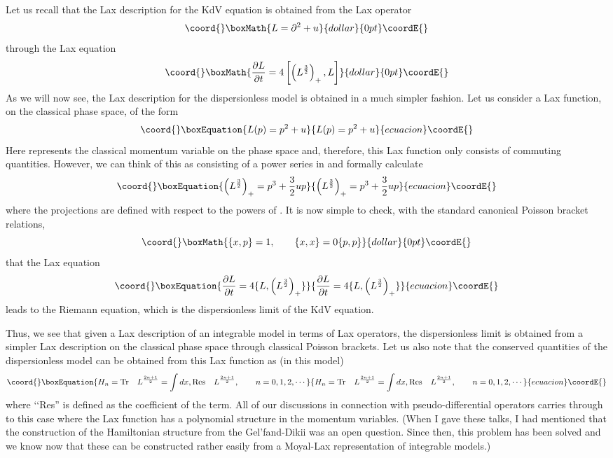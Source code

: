 \documentclass[a4paper,11pt]{article}
\begin{document}
Let us recall that the Lax description for the KdV equation is
obtained from the Lax operator
$$\coord{}\boxMath{
L = \partial^{2} + u
}{dollar}{0pt}\coordE{}$$
through the Lax equation
$$\coord{}\boxMath{
{\partial L\over \partial t} = 4 \left[\left(L^{3\over 2}\right)_{+} ,
L\right]
}{dollar}{0pt}\coordE{}$$
As we will now see, the Lax description for the dispersionless model
is obtained in a much simpler fashion. Let us consider a Lax function,
on the classical phase space, of the form
\begin{equation}\coord{}\boxEquation{
L (p) = p^{2} + u
}{
L (p) = p^{2} + u
}{ecuacion}\coordE{}\end{equation}
Here \coordHE{} represents the classical momentum variable on the phase space
and, therefore, this Lax function only consists of commuting
quantities. However, we can think of this as consisting of a power
series in \coordHE{} and formally calculate
\begin{equation}\coord{}\boxEquation{
\left(L^{3\over 2}\right)_{+} = p^{3} + {3\over 2} u p
}{
\left(L^{3\over 2}\right)_{+} = p^{3} + {3\over 2} u p
}{ecuacion}\coordE{}\end{equation}
where the projections are defined with respect to the powers of
\coordHE{}. It is now simple to check, with the standard canonical Poisson
bracket relations,
$$\coord{}\boxMath{
\{x,p\} = 1,\qquad \{x,x\} = 0 \{p,p\}
}{dollar}{0pt}\coordE{}$$
that the Lax equation
\begin{equation}\coord{}\boxEquation{
{\partial L\over \partial t} = 4 \{L, \left(L^{3\over 2}\right)_{+}\}
}{
{\partial L\over \partial t} = 4 \{L, \left(L^{3\over 2}\right)_{+}\}
}{ecuacion}\coordE{}\end{equation}
leads to the Riemann equation, which is the dispersionless limit of
the KdV equation.

Thus, we see that given a Lax description of an integrable model in
terms of Lax operators, the dispersionless limit is obtained from a
simpler Lax description on the classical phase space through classical
Poisson brackets. Let us also note that the conserved quantities of
the dispersionless model can be obtained from this Lax function as (in
this model)
\begin{equation}\coord{}\boxEquation{
H_{n} = {\rm Tr}\quad L^{2n+1\over 2} = \int dx, {\rm Res}\quad
L^{2n+1\over 2},\qquad n = 0,1,2,\cdots
}{
H_{n} = {\rm Tr}\quad L^{2n+1\over 2} = \int dx, {\rm Res}\quad
L^{2n+1\over 2},\qquad n = 0,1,2,\cdots
}{ecuacion}\coordE{}\end{equation}
where \lq\lq Res'' is defined as the coefficient of the \coordHE{}
term. All of our discussions in connection with pseudo-differential
operators carries through to this case where the Lax function has a
polynomial structure in the momentum variables. (When I gave these
talks, I had mentioned that the construction of the Hamiltonian
structure from the Gel'fand-Dikii was an open question. Since then,
this problem has been solved and we know now that these can be
constructed rather easily from a Moyal-Lax representation of
integrable models.)
\end{document}
